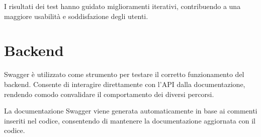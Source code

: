   I risultati dei test hanno guidato miglioramenti iterativi, contribuendo a una maggiore usabilità e soddisfazione degli utenti.

\section{Backend}
Swagger è utilizzato come strumento per testare il corretto funzionamento del backend. Consente di interagire direttamente con l'API dalla documentazione, rendendo comodo convalidare il comportamento dei diversi percorsi.

La documentazione Swagger viene generata automaticamente in base ai commenti inseriti nel codice, consentendo di mantenere la documentazione aggiornata con il codice.